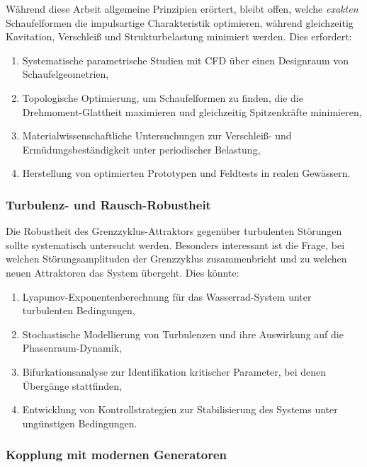 \documentclass[a4paper,12pt]{article}
\theoremstyle{definition}
\begin{document}
Während diese Arbeit allgemeine Prinzipien erörtert, bleibt offen, welche \textit{exakten} Schaufelformen die impulsartige Charakteristik optimieren, während gleichzeitig Kavitation, Verschleiß und Strukturbelastung minimiert werden. Dies erfordert:
\begin{enumerate}
  \item Systematische parametrische Studien mit CFD über einen Designraum von Schaufelgeometrien,
  \item Topologische Optimierung, um Schaufelformen zu finden, die die Drehmoment-Glattheit maximieren und gleichzeitig Spitzenkräfte minimieren,
  \item Materialwissenschaftliche Untersuchungen zur Verschleiß- und Ermüdungsbeständigkeit unter periodischer Belastung,
  \item Herstellung von optimierten Prototypen und Feldtests in realen Gewässern.
\end{enumerate}

\subsubsection*{Turbulenz- und Rausch-Robustheit}

Die Robustheit des Grenzzyklus-Attraktors gegenüber turbulenten Störungen sollte systematisch untersucht werden. Besonders interessant ist die Frage, bei welchen Störungsamplituden der Grenzzyklus zusammenbricht und zu welchen neuen Attraktoren das System übergeht. Dies könnte:
\begin{enumerate}
  \item Lyapunov-Exponentenberechnung für das Wasserrad-System unter turbulenten Bedingungen,
  \item Stochastische Modellierung von Turbulenzen und ihre Auswirkung auf die Phasenraum-Dynamik,
  \item Bifurkationsanalyse zur Identifikation kritischer Parameter, bei denen Übergänge stattfinden,
  \item Entwicklung von Kontrollstrategien zur Stabilisierung des Systems unter ungünstigen Bedingungen.
\end{enumerate}

\subsubsection*{Kopplung mit modernen Generatoren}
\end{document}
